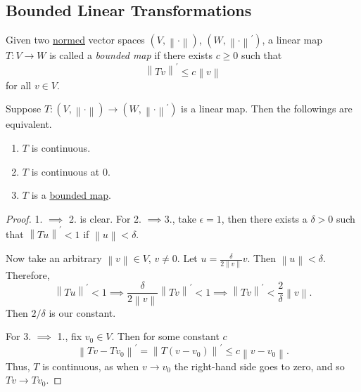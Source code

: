\subsection{Bounded Linear Transformations}
\begin{definition}\label{def:bounded-linear-transformation}
	Given two \hyperref[def:norm]{normed} vector spaces \((V,\left\lVert \cdot\right\rVert )\), \((W,\left\lVert \cdot\right\rVert^\prime )\),
	a linear map \(T \colon V \to W\) is called a \emph{bounded map} if there exists \(c \geq 0\) such that
	\[
		\left\lVert Tv\right\rVert^\prime \leq c\left\lVert v\right\rVert
	\]
	for all \(v \in V\).
\end{definition}

\begin{proposition}
	Suppose \(T \colon (V, \left\lVert \cdot\right\rVert) \to (W, \left\lVert \cdot\right\rVert^\prime )\) is a linear map. Then the followings are equivalent.
	\begin{enumerate}
		\item \(T\) is continuous.
		\item \(T\) is continuous at \(0\).
		\item \(T\) is a \hyperref[def:bounded-linear-transformation]{bounded map}.
	\end{enumerate}
\end{proposition}
\begin{proof}
	1. \(\implies\) 2. is clear. For 2. \(\implies\)3., take \(\epsilon = 1\), then there exists a \(\delta > 0\) such that \(\left\lVert Tu\right\rVert^\prime < 1\)
	if \(\left\lVert u\right\rVert < \delta\).

	Now take an arbitrary \(\left\lVert v \right\rVert\in V\), \(v \neq 0\). Let \(u = \frac{\delta}{2\left\lVert v\right\rVert}v\). Then \(\left\lVert u\right\rVert < \delta\).
	Therefore,
	\[
		\left\lVert Tu\right\rVert ^\prime <1 \implies \frac{\delta }{2\left\lVert v\right\rVert }\left\lVert Tv\right\rVert ^\prime < 1\implies \left\lVert Tv\right\rVert ^\prime < \frac{2}{\delta }\left\lVert v\right\rVert .
	\]
	Then \(2/\delta\) is our constant.

	For 3. \(\implies\) 1., fix \(v_0 \in V\). Then for some constant \(c\)
	\[
		\left\lVert Tv - Tv_0\right\rVert^\prime = \left\lVert T(v - v_0)\right\rVert ^\prime \leq c\left\lVert v - v_0\right\rVert.
	\]
	Thus, \(T\) is continuous, as when \(v \to v_0\) the right-hand side goes to zero, and so \(Tv \to Tv_0\).
\end{proof}

